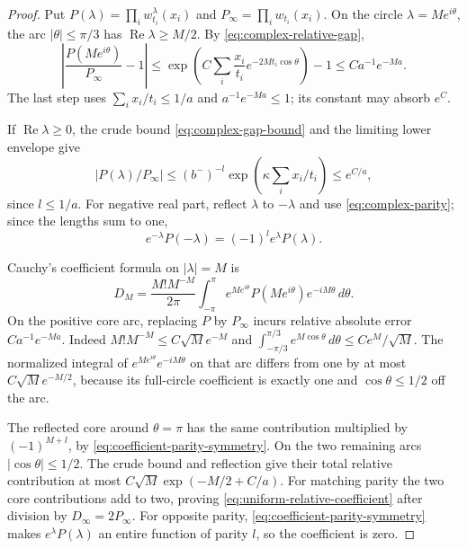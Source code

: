 \documentclass[11pt,letterpaper]{article}
\begin{document}
\begin{proof}
Put $P(\lambda)=\prod_iw_{t_i}^\lambda(x_i)$ and
$P_\infty=\prod_iw_{t_i}(x_i)$. On the circle
$\lambda=Me^{i\theta}$, the arc $|\theta|\le\pi/3$ has
$\operatorname{Re}\lambda\ge M/2$. By
\eqref{eq:complex-relative-gap},
\begin{equation}\label{eq:coefficient-core-error}
 \left|\frac{P(Me^{i\theta})}{P_\infty}-1\right|
 \le\exp\left(C\sum_i\frac{x_i}{t_i}
                       e^{-2Mt_i\cos\theta}\right)-1
 \le C a^{-1}e^{-Ma}.
\end{equation}
The last step uses $\sum_i x_i/t_i\le1/a$ and
$a^{-1}e^{-Ma}\le1$; its constant may absorb $e^C$.

If $\operatorname{Re}\lambda\ge0$, the crude bound
\eqref{eq:complex-gap-bound} and the limiting lower envelope give
\[
 |P(\lambda)/P_\infty|
 \le(b^-)^{-l}\exp\left(\kappa\sum_i x_i/t_i\right)
 \le e^{C/a},
\]
since $l\le1/a$. For negative real part, reflect $\lambda$ to
$-\lambda$ and use \eqref{eq:complex-parity}; since the lengths
sum to one,
\begin{equation}\label{eq:coefficient-parity-symmetry}
 e^{-\lambda}P(-\lambda)=(-1)^l e^\lambda P(\lambda).
\end{equation}

Cauchy's coefficient formula on $|\lambda|=M$ is
\[
 D_M=\frac{M!M^{-M}}{2\pi}
       \int_{-\pi}^{\pi}e^{Me^{i\theta}}
               P(Me^{i\theta})e^{-iM\theta}\,d\theta.
\]
On the positive core arc, replacing $P$ by $P_\infty$ incurs
relative absolute error $Ca^{-1}e^{-Ma}$. Indeed
$M!M^{-M}\le C\sqrt M e^{-M}$ and
$\int_{-\pi/3}^{\pi/3}e^{M\cos\theta}\,d\theta
\le Ce^M/\sqrt M$.
The normalized integral of $e^{Me^{i\theta}}e^{-iM\theta}$
on that arc differs from one by at most
$C\sqrt M e^{-M/2}$, because its full-circle coefficient is
exactly one and $\cos\theta\le1/2$ off the arc.

The reflected core around $\theta=\pi$ has the same contribution
multiplied by $(-1)^{M+l}$, by
\eqref{eq:coefficient-parity-symmetry}. On the two remaining
arcs $|\cos\theta|\le1/2$. The crude bound and reflection give
their total relative contribution at most
$C\sqrt M\exp(-M/2+C/a)$.
For matching parity the two core contributions add to two,
proving \eqref{eq:uniform-relative-coefficient} after division
by $D_\infty=2P_\infty$. For opposite parity,
\eqref{eq:coefficient-parity-symmetry} makes $e^\lambda P(\lambda)$
an entire function of parity $l$, so the coefficient is zero.
\end{proof}
\end{document}
